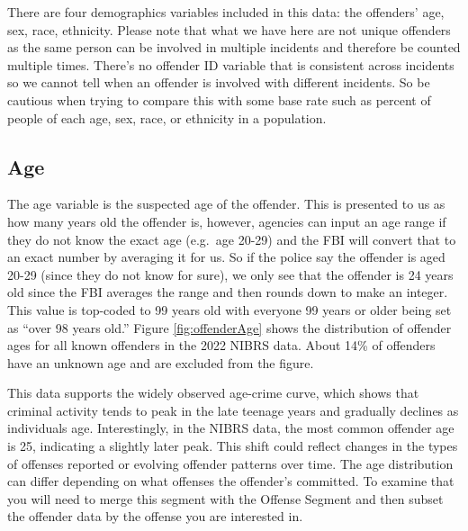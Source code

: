 \documentclass[
]{krantz}
\begin{document}
There are four demographics variables included in this data:
the offenders' age, sex, race, ethnicity. Please note that
what we have here are not unique offenders as the same
person can be involved in multiple incidents and therefore
be counted multiple times. There's no offender ID variable
that is consistent across incidents so we cannot tell when
an offender is involved with different incidents. So be
cautious when trying to compare this with some base rate
such as percent of people of each age, sex, race, or
ethnicity in a population.

\subsection{Age}\label{age-2}

The age variable is the suspected age of the offender. This
is presented to us as how many years old the offender is,
however, agencies can input an age range if they do not know
the exact age (e.g.~age 20-29) and the FBI will convert that
to an exact number by averaging it for us. So if the police
say the offender is aged 20-29 (since they do not know for
sure), we only see that the offender is 24 years old since
the FBI averages the range and then rounds down to make an
integer. This value is top-coded to 99 years old with
everyone 99 years or older being set as ``over 98 years
old.'' Figure \ref{fig:offenderAge} shows the distribution
of offender ages for all known offenders in the 2022 NIBRS
data. About 14\% of offenders have an unknown age and are
excluded from the figure.

This data supports the widely observed age-crime curve,
which shows that criminal activity tends to peak in the late
teenage years and gradually declines as individuals age.
Interestingly, in the NIBRS data, the most common offender
age is 25, indicating a slightly later peak. This shift
could reflect changes in the types of offenses reported or
evolving offender patterns over time. The age distribution
can differ depending on what offenses the offender's
committed. To examine that you will need to merge this
segment with the Offense Segment and then subset the
offender data by the offense you are interested in.
\end{document}
